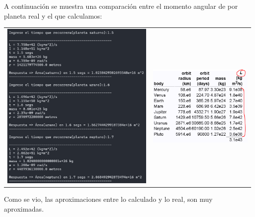 \documentclass[a4paper,12pt]{article}
\begin{document}

    A continuación se muestra una comparación entre el momento angular
    de por planeta real y el que calculamos:
    \begin{table}[!htbp]
        \centering
        \begin{tabular}{cc}
            \begin{minipage}{.3\textwidth}
                \includegraphics[width=\linewidth]{e3_3}
            \end{minipage}&\begin{minipage}{.3\textwidth}
                \includegraphics[width=\linewidth]{e3real}
            \end{minipage}
        \end{tabular}
    \end{table}
    Como se vio, las aproximaciones entre lo calculado y lo real, son muy aproximadas.
    
\end{document}
